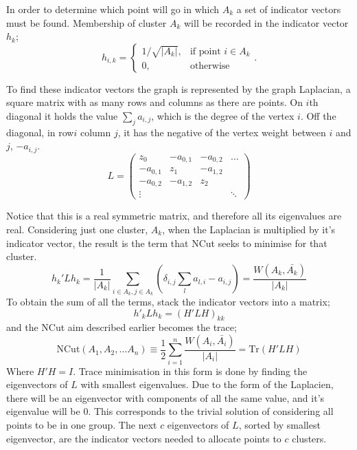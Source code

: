 In order to determine which point will go in which \(A_k\) a set of indicator vectors must be found.
Membership of cluster \(A_k\) will be recorded in the indicator vector \(h_k\);
\begin{equation}
    h_{i, k}= 
    \begin{cases}
        1/\sqrt{|A_k|},& \text{if point } i \in A_k \\
        0,              & \text{otherwise}
    \end{cases}
    .
\end{equation}

To find these indicator vectors the graph is represented by the graph Laplacian, a square
matrix with as many rows and columns as there are points.
On \(i\)th diagonal it holds the value \(\sum_j a_{i, j}\),
which is the degree of the vertex \(i\).
Off the diagonal, in row\(i\) column \(j\), it has the negative of the vertex weight between \(i\) and \(j\), \(-a_{i, j}\).
\begin{equation}\label{eqn:laplacian}
    L = 
    \begin{pmatrix}
        z_0 & -a_{0,1} & -a_{0,2} & \hdots \\
        -a_{0,1} & z_1 & -a_{1,2} & \\
        -a_{0,2} & -a_{1,2} & z_2 & \\
        \vdots   &          &     & \ddots 
    \end{pmatrix}
\end{equation}

Notice that this is a real symmetric matrix,
and therefore all its eigenvalues are real.
Considering just one cluster, \(A_k\), when the Laplacian is multiplied by it's indicator vector,
the result is the term that NCut seeks to minimise for that cluster.
\begin{equation}
    h_k'Lh_k = \frac{1}{|A_k|}\sum_{i \in A_k, j \in A_k} \left(\delta_{i, j}\sum_{l} a_{l, i} - a_{i, j} \right) = \frac{W(A_k, \bar{A_k})}{|A_k|}
\end{equation}
To obtain the sum of all the terms, stack the indicator vectors into a matrix;
\begin{equation} h'_k L h_k = (H'L H)_{kk}\end{equation}
and the NCut aim described earlier becomes the trace;
\begin{equation} \text{NCut}(A_1,A_2, \dots A_n) \equiv \frac{1}{2} \sum_{i=1}^n \frac{W(A_i, \bar{A_i})}{|A_i|} = \text{Tr}(H'LH)\end{equation}
Where \(H'H = I\).
Trace minimisation in this form is done
by finding the eigenvectors of \(L\) with smallest 
eigenvalues.
Due to the form of the Laplacien, there will be an eigenvector with components of all the same value, and it's eigenvalue will be \(0\).
This corresponds to the trivial solution of considering all points to be in one group.
The next \(c\) eigenvectors of \(L\), sorted by smallest eigenvector, are the indicator vectors needed to allocate points to \(c\) clusters.

